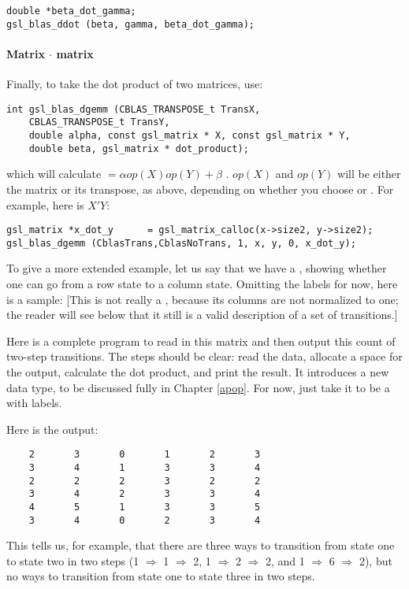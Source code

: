 \begin{lstlisting}
double *beta_dot_gamma;
gsl_blas_ddot (beta, gamma, beta_dot_gamma);
\end{lstlisting}

\paragraph{Matrix $\cdot$ matrix}
Finally, to take the dot product of two matrices, use:
\begin{lstlisting}
int gsl_blas_dgemm (CBLAS_TRANSPOSE_t TransX, 
    CBLAS_TRANSPOSE_t TransY, 
    double alpha, const gsl_matrix * X, const gsl_matrix * Y, 
    double beta, gsl_matrix * dot_product);
\end{lstlisting}
which will calculate  $= \alpha op(X) op(Y) + \beta$ . $op(X)$ and
$op(Y)$ will be either the matrix or its transpose, as above, depending on whether you choose 
or . For example, here is $X'Y$:

\begin{lstlisting}
gsl_matrix *x_dot_y      = gsl_matrix_calloc(x->size2, y->size2);
gsl_blas_dgemm (CblasTrans,CblasNoTrans, 1, x, y, 0, x_dot_y);
\end{lstlisting}

To give a more extended example, let us say that we have a , showing whether one can go from a row state to a
column state. Omitting the labels for now, here is a sample:
\label{twostep} 
[This is not really a , because its
columns are not normalized to one; the reader will see below that it
still is a valid description of a set of transitions.]

Here is a complete program to read in this matrix and then output this
count of two-step transitions. The steps should be clear: read the data,
allocate a space for the output, calculate the dot product, and print
the result. It introduces a new data type,  to be
discussed fully in Chapter \ref{apop}. For now, just take it to be a
 with labels.

Here is the output:
\begin{lstlisting}
    2       3       0       1       2       3
    3       4       1       3       3       4
    2       2       2       3       2       2
    3       4       2       3       3       4
    4       5       1       3       3       5
    3       4       0       2       3       4
\end{lstlisting}
This tells us, for example, that there are three ways to transition from state one to
state two in two steps (1 $\Rightarrow$ 1 $\Rightarrow$ 2, 
1 $\Rightarrow$ 2 $\Rightarrow$ 2,  and 1 $\Rightarrow$ 6 $\Rightarrow$
2), but no ways to transition from state one to state three in two steps.



